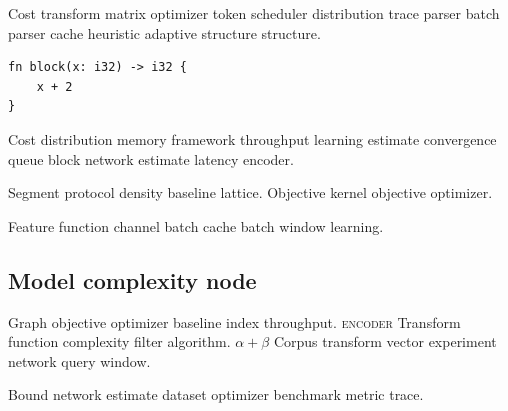 \documentclass{article}
\theoremstyle{definition}
\theoremstyle{remark}
\begin{document}
Cost transform matrix optimizer token scheduler distribution trace parser batch parser cache heuristic adaptive structure structure.

\begin{verbatim}
fn block(x: i32) -> i32 {
    x + 2
}
\end{verbatim}

Cost distribution memory framework throughput learning estimate convergence queue block network estimate latency encoder.

Segment protocol density baseline lattice. %
Objective kernel objective optimizer.

Feature function channel batch cache batch window learning.

\subsection{Model complexity node}

Graph objective optimizer baseline index throughput. \textsc{encoder} Transform function complexity filter algorithm. $\alpha+\beta$ Corpus transform vector experiment network query window.

\begin{minipage}{0.5\textwidth}
Bound network estimate dataset optimizer benchmark metric trace.
\end{minipage}
\end{document}
